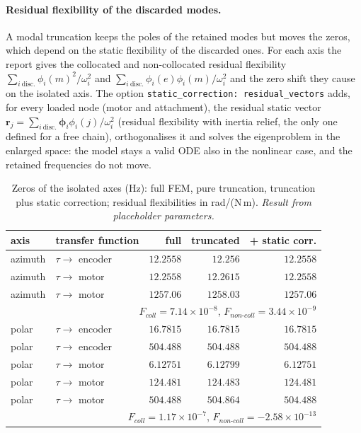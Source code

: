 \documentclass[10pt,a4paper]{article}
\numberwithin{equation}{section}
\begin{document}
\paragraph{Residual flexibility of the discarded modes.} A modal truncation keeps the poles of the retained modes but moves the zeros, which depend on the static flexibility of the discarded ones. For each axis the report gives the collocated and non-collocated residual flexibility $\sum_{i\ \text{disc.}}\phi_i(m)^2/\omega_i^2$ and $\sum_{i\ \text{disc.}}\phi_i(e)\phi_i(m)/\omega_i^2$ and the zero shift they cause on the isolated axis. The option \texttt{static\_correction: residual\_vectors} adds, for every loaded node (motor and attachment), the residual static vector $\mathbf r_j = \sum_{i\ \text{disc.}}\boldsymbol\phi_i\phi_i(j)/\omega_i^2$ (residual flexibility with inertia relief, the only one defined for a free chain), orthogonalises it and solves the eigenproblem in the enlarged space: the model stays a valid ODE also in the nonlinear case, and the retained frequencies do not move.
\begin{table}[H]\centering\small
\caption{Zeros of the isolated axes (Hz): full FEM, pure truncation, truncation plus static correction; residual flexibilities in rad/(N\,m). \emph{Result from placeholder parameters.}}\label{tab:modal_zeros}
\begin{tabular}{llrrr}\toprule
axis & transfer function & full & truncated & + static corr. \\ \midrule
azimuth & $\tau\to$ encoder & $12.2558$ & $12.256$ & $12.2558$ \\
azimuth & $\tau\to$ motor & $12.2558$ & $12.2615$ & $12.2558$ \\
azimuth & $\tau\to$ motor & $1257.06$ & $1258.03$ & $1257.06$ \\
\multicolumn{5}{r}{\footnotesize $F_{coll} = 7.14\times10^{-8}$, $F_{non\text{-}coll} = 3.44\times10^{-9}$} \\ \midrule
polar & $\tau\to$ encoder & $16.7815$ & $16.7815$ & $16.7815$ \\
polar & $\tau\to$ encoder & $504.488$ & $504.488$ & $504.488$ \\
polar & $\tau\to$ motor & $6.12751$ & $6.12799$ & $6.12751$ \\
polar & $\tau\to$ motor & $124.481$ & $124.483$ & $124.481$ \\
polar & $\tau\to$ motor & $504.488$ & $504.864$ & $504.488$ \\
\multicolumn{5}{r}{\footnotesize $F_{coll} = 1.17\times10^{-7}$, $F_{non\text{-}coll} = -2.58\times10^{-13}$} \\ \midrule
\bottomrule\end{tabular}\end{table}
\end{document}
